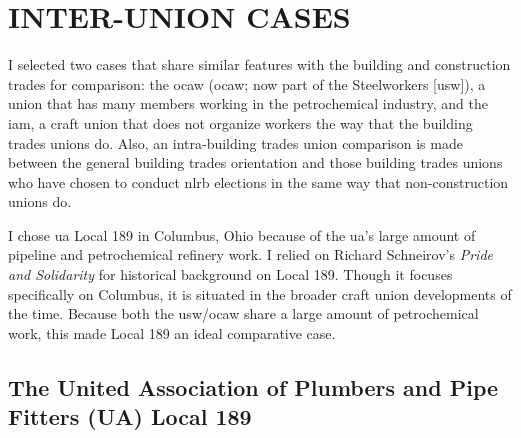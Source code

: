 \documentclass[12pt]{article}
\begin{document}
\section{INTER-UNION CASES}

I selected two cases that share similar features with the building and construction trades for comparison: the \acrlong{ocaw} (\acrshort{ocaw}; now part of the Steelworkers [\acrshort{usw}]), a union that has many members working in the petrochemical industry, and the \acrfull{iam}, a craft union that does not organize workers the way that the building trades unions do. Also, an intra-building trades union comparison is made between the general building trades orientation and those building trades unions who have chosen to conduct \acrshort{nlrb} elections in the same way that non-construction unions do.

I chose \acrfull{ua} Local 189 in Columbus, Ohio because of the \acrfull{ua}'s large amount of pipeline and petrochemical refinery work. I relied on Richard Schneirov's \textit{Pride and Solidarity} for historical background on Local 189. Though it focuses specifically on Columbus, it is situated in the broader craft union developments of the time. Because both the \acrfull{usw}/\acrfull{ocaw} share a large amount of petrochemical work, this made Local 189 an ideal comparative case.

\subsection{The United Association of Plumbers and Pipe Fitters (UA) Local 189}\
\end{document}
